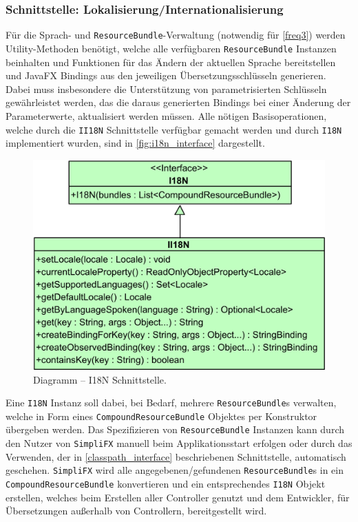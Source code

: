 \subsubsection{Schnittstelle: Lokalisierung/Internationalisierung}
Für die Sprach- und \texttt{ResourceBundle}-Verwaltung (notwendig für \autoref{freq3}) werden Utility-Methoden benötigt, welche alle verfügbaren \texttt{ResourceBundle} Instanzen beinhalten und Funktionen für das Ändern der aktuellen Sprache bereitstellen und JavaFX Bindings aus den jeweiligen Übersetzungsschlüsseln generieren. Dabei muss insbesondere die Unterstützung von parametrisierten Schlüsseln gewährleistet werden, das die daraus generierten Bindings bei einer Änderung der Parameterwerte, aktualisiert werden müssen. Alle nötigen Basisoperationen, welche durch die \texttt{II18N} Schnittstelle verfügbar gemacht werden und durch \texttt{I18N} implementiert wurden, sind in \autoref{fig:i18n_interface} dargestellt.
\begin{figure}[H]
	\centering
	\includegraphics[width=\textwidth-2cm]{Abbildungen/I18N.png}
	\caption{Diagramm -- I18N Schnittstelle.}
	\label{fig:i18n_interface}
\end{figure}
\noindent Eine \texttt{I18N} Instanz soll dabei, bei Bedarf, mehrere \texttt{ResourceBundle}s verwalten, welche in Form eines \texttt{CompoundResourceBundle} Objektes per Konstruktor übergeben werden. Das Spezifizieren von \texttt{ResourceBundle} Instanzen kann durch den Nutzer von \texttt{SimpliFX} manuell beim Applikationsstart erfolgen oder durch das Verwenden, der in \autoref{classpath_interface} beschriebenen Schnittstelle, automatisch geschehen. \texttt{SimpliFX} wird alle angegebenen/gefundenen \texttt{ResourceBundle}s in ein \texttt{CompoundResourceBundle} konvertieren und ein entsprechendes \texttt{I18N} Objekt erstellen, welches beim Erstellen aller Controller genutzt und dem Entwickler, für Übersetzungen außerhalb von Controllern, bereitgestellt wird.
